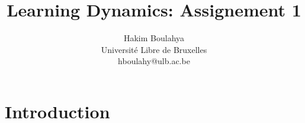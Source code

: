 \documentclass[letterpaper]{article}
\title{Learning Dynamics: Assignement 1}
\author{Hakim Boulahya \\
Université Libre de Bruxelles\\
hboulahy@ulb.ac.be}
\begin{document}
\maketitle



\section*{Introduction}
\end{document}
